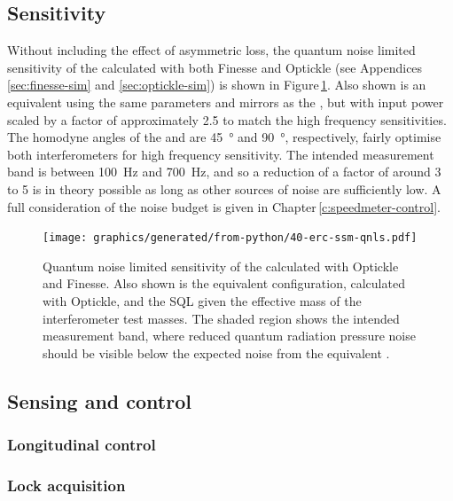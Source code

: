 \subsection{Sensitivity}
Without including the effect of asymmetric loss, the quantum noise limited sensitivity of the \SSMEXPT{} calculated with both Finesse and Optickle (see Appendices \ref{sec:finesse-sim} and \ref{sec:optickle-sim}) is shown in Figure\,\ref{fig:erc-ssm-qnls}. Also shown is an equivalent \MI{} using the same parameters and mirrors as the \SSM{}, but with input power scaled by a factor of approximately \num{2.5} to match the high frequency sensitivities. The homodyne angles of the \SSM{} and \MI{} are \SI{45}{\degree} and \SI{90}{\degree}, respectively, fairly optimise both interferometers for high frequency sensitivity. The intended measurement band is between \SI{100}{\hertz} and \SI{700}{\hertz}, and so a reduction of a factor of around \num{3} to \num{5} is in theory possible as long as other sources of noise are sufficiently low. A full consideration of the noise budget is given in Chapter\,\ref{c:speedmeter-control}.

\begin{figure}
  \centering
  \texttt{[image: graphics/generated/from-python/40-erc-ssm-qnls.pdf]}
  \caption[Quantum noise limited sensitivity of the \SSMEXPT{}]{\label{fig:erc-ssm-qnls}Quantum noise limited sensitivity of the \SSMEXPT{} calculated with Optickle and Finesse. Also shown is the equivalent \MI{} configuration, calculated with Optickle, and the \gls{SQL} given the effective mass of the interferometer test masses. The shaded  region shows the intended measurement band, where reduced quantum radiation pressure noise should be visible below the expected noise from the equivalent \MI{}.}
\end{figure}

\subsection{Sensing and control}

\subsubsection{Longitudinal control}

\subsubsection{Lock acquisition}


